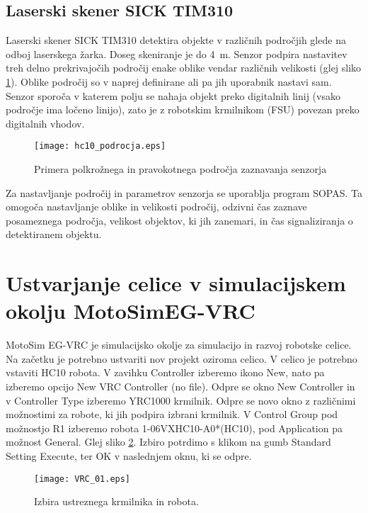 \subsection{Laserski skener SICK TIM310}

Laserski skener SICK TIM310 detektira objekte v različnih področjih glede na odboj laserskega žarka. Doseg skeniranje je do 4~m. Senzor podpira nastavitev treh delno prekrivajočih področij enake oblike vendar različnih velikosti (glej sliko \ref{fig:hc10_sick}). Oblike področij so  v naprej definirane ali pa jih uporabnik nastavi sam. Senzor sporoča v katerem polju se nahaja objekt preko digitalnih linij (vsako področje ima ločeno linijo), zato je z robotskim krmilnikom (FSU) povezan preko digitalnih vhodov.

\begin{figure}[!hbt]
	\centering
	\texttt{[image: hc10\_podrocja.eps]}
	\caption{Primera polkrožnega in pravokotnega področja zaznavanja senzorja}
	\label{fig:hc10_sick}
\end{figure}

Za nastavljanje področij in parametrov senzorja se uporablja program SOPAS. Ta omogoča nastavljanje oblike in velikosti področij, odzivni čas zaznave posameznega področja, velikost objektov, ki jih zanemari, in čas signaliziranja o detektiranem objektu.


\section{Ustvarjanje celice v simulacijskem okolju MotoSimEG-VRC}

MotoSim EG-VRC je simulacijsko okolje za simulacijo in razvoj robotske celice. Na začetku je potrebno ustvariti nov projekt oziroma celico. V celico je potrebno vstaviti HC10 robota. V zavihku Controller izberemo ikono New, nato pa izberemo opcijo New VRC Controller (no file). Odpre se okno New Controller in v Controller Type izberemo YRC1000 krmilnik. Odpre se novo okno z različnimi možnostimi za robote, ki jih podpira izbrani krmilnik. V Control Group pod možnostjo R1 izberemo robota 1-06VXHC10-A0*(HC10), pod Application pa možnost General. Glej sliko \ref{fig:VRC_01}. Izbiro potrdimo s klikom na gumb Standard Setting Execute, ter OK v naslednjem oknu, ki se odpre.

\begin{figure}[hbt]
	\centering
	\texttt{[image: VRC\_01.eps]}
	\caption{Izbira ustreznega krmilnika in robota.}
	\label{fig:VRC_01}
\end{figure}

